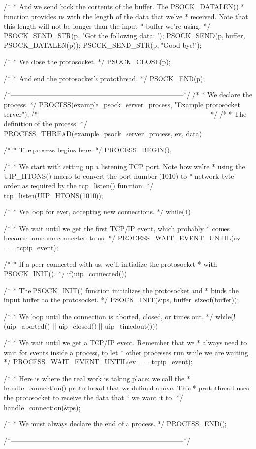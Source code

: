 \begin{DoxyCodeInclude}
{  /*
   * And we send back the contents of the buffer. The PSOCK_DATALEN()
   * function provides us with the length of the data that we've
   * received. Note that this length will not be longer than the input
   * buffer we're using.
   */
  PSOCK_SEND_STR(p, "Got the following data: ");
  PSOCK_SEND(p, buffer, PSOCK_DATALEN(p));
  PSOCK_SEND_STR(p, "Good bye!\r\n");

  /*
   * We close the protosocket.
   */
  PSOCK_CLOSE(p);

  /*
   * And end the protosocket's protothread.
   */
  PSOCK_END(p);
}
/*---------------------------------------------------------------------------*/
/*
 * We declare the process.
 */
PROCESS(example_psock_server_process, "Example protosocket server");
/*---------------------------------------------------------------------------*/
/*
 * The definition of the process.
 */
PROCESS_THREAD(example_psock_server_process, ev, data)
{
  /*
   * The process begins here.
   */
  PROCESS_BEGIN();

  /*
   * We start with setting up a listening TCP port. Note how we're
   * using the UIP_HTONS() macro to convert the port number (1010) to
   * network byte order as required by the tcp_listen() function.
   */
  tcp_listen(UIP_HTONS(1010));

  /*
   * We loop for ever, accepting new connections.
   */
  while(1) {

    /*
     * We wait until we get the first TCP/IP event, which probably
     * comes because someone connected to us.
     */
    PROCESS_WAIT_EVENT_UNTIL(ev == tcpip_event);

    /*
     * If a peer connected with us, we'll initialize the protosocket
     * with PSOCK_INIT().
     */
    if(uip_connected()) {
      
      /*
       * The PSOCK_INIT() function initializes the protosocket and
       * binds the input buffer to the protosocket.
       */
      PSOCK_INIT(&ps, buffer, sizeof(buffer));

      /*
       * We loop until the connection is aborted, closed, or times out.
       */
      while(!(uip_aborted() || uip_closed() || uip_timedout())) {

        /*
         * We wait until we get a TCP/IP event. Remember that we
         * always need to wait for events inside a process, to let
         * other processes run while we are waiting.
         */
        PROCESS_WAIT_EVENT_UNTIL(ev == tcpip_event);

        /*
         * Here is where the real work is taking place: we call the
         * handle_connection() protothread that we defined above. This
         * protothread uses the protosocket to receive the data that
         * we want it to.
         */
        handle_connection(&ps);
      }
    }
  }
  
  /*
   * We must always declare the end of a process.
   */
  PROCESS_END();
}
/*---------------------------------------------------------------------------*/
\end{DoxyCodeInclude}
 